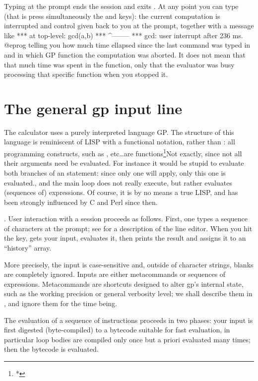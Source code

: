 
Typing  at the prompt ends the session and exits . At any
point you can type  (that is press simultaneously the
 and  keys): the current computation is interrupted and
control given back to you at the  prompt, together with a message
like
\bprog
  ***   at top-level: gcd(a,b)
  ***                 ^--------
  *** gcd: user interrupt after 236 ms.
@eprog\noindent
telling you how much time ellapsed since the last command was typed in and
in which GP function the computation was aborted. It does not mean that that
much time was spent in the function, only that the evaluator was busy
processing that specific function when you stopped it.

\section{The general gp input line}

The  calculator uses a purely interpreted language GP. The structure
of this language is reminiscent of LISP with a functional notation,
 rather than : all programming constructs,
such as ,  etc\dots are functions\footnote{*}{Not exactly,
since not all their arguments need be evaluated. For instance it would be
stupid to evaluate both branches of an  statement: since only one
will apply, only this one is evaluated.}, and the main loop does not really
execute, but rather evaluates (sequences of) expressions. Of course, it is by
no means a true LISP, and has been strongly influenced by C and Perl since
then.

. User interaction with a  session proceeds as
follows. First, one types a sequence of characters at the  prompt;
see  for a description of the line editor. When you hit
the  key,  gets your input, evaluates it, then prints
the result and assigns it to an ``history'' array.

More precisely, the input is case-sensitive and, outside of character
strings, blanks are completely ignored. Inputs are either metacommands or
sequences of expressions. Metacommands are shortcuts designed to alter gp's
internal state, such as the working precision or general verbosity level; we
shall describe them in , and ignore them for the time being.

The evaluation of a sequence of instructions proceeds in two phases: your
input is first digested (byte-compiled) to a bytecode suitable for fast
evaluation, in particular loop bodies are compiled only once but a priori
evaluated many times; then the bytecode is evaluated.

